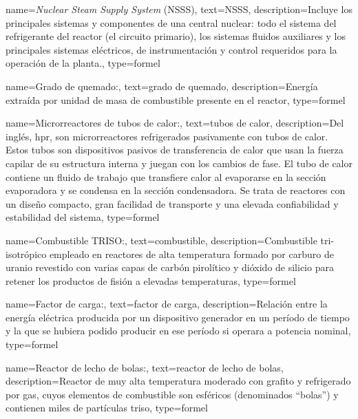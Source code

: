 
\usepackage{glossaries}


\makenoidxglossaries

{
    name=\emph{Nuclear Steam Supply System} (NSSS),
    text={NSSS},
    description={Incluye los principales sistemas y componentes de una central nuclear: todo el sistema del refrigerante del reactor (el circuito primario), los sistemas fluidos auxiliares y los principales sistemas eléctricos, de instrumentación y control requeridos para la operación de la planta.},
    type=formel
}

{
    name=Grado de quemado:,
    text={grado de quemado},
    description={Energía extraída por unidad de masa de combustible presente en el reactor},
    type=formel
}

{
    name=Microrreactores de tubos de calor:,
    text={tubos de calor},
    description={Del inglés, \acrfull{hpr}, son microrreactores refrigerados pasivamente con tubos de calor. Estos tubos son dispositivos pasivos de transferencia de calor que usan la fuerza capilar de su estructura interna y juegan con los cambios de fase. El tubo de calor contiene un fluido de trabajo que transfiere calor al evaporarse en la sección evaporadora y se condensa en la sección condensadora. Se trata de reactores con un diseño compacto, gran facilidad de transporte y una elevada confiabilidad y estabilidad del sistema},
    type=formel
}

{
    name=Combustible TRISO:,
    text={combustible},
    description={Combustible tri-isotrópico empleado en reactores de alta temperatura formado por carburo de uranio revestido con varias capas de carbón pirolítico y dióxido de silicio para retener los productos de fisión a elevadas temperaturas},
    type=formel
}

{
    name=Factor de carga:,
    text={factor de carga},
    description={Relación entre la energía eléctrica producida por un dispositivo generador en un período de tiempo y la que se hubiera podido producir en ese período si operara a potencia nominal},
    type=formel
}

{
    name=Reactor de lecho de bolas:,
    text={reactor de lecho de bolas},
    description={Reactor de muy alta temperatura moderado con grafito y refrigerado por gas, cuyos elementos de combustible son esféricos (denominados ``bolas'') y contienen miles de partículas \acrshort{triso}},
    type=formel
}

